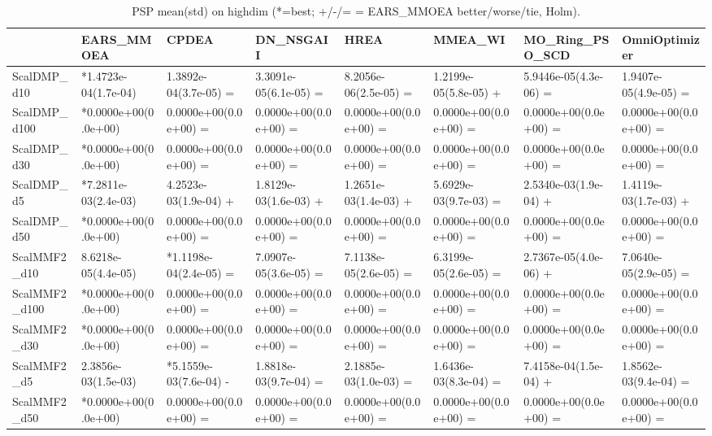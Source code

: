 \begin{table}[t]
\centering
\caption{PSP mean(std) on highdim (*=best; +/-/= = EARS_MMOEA better/worse/tie, Holm).}
\label{tab:highdim_PSP}
\begin{tabular}{llllllll}
\toprule
 & EARS\_MMOEA & CPDEA & DN\_NSGAII & HREA & MMEA\_WI & MO\_Ring\_PSO\_SCD & OmniOptimizer \\
\midrule
ScalDMP\_d10 & *1.4723e-04(1.7e-04) & 1.3892e-04(3.7e-05) = & 3.3091e-05(6.1e-05) = & 8.2056e-06(2.5e-05) = & 1.2199e-05(5.8e-05) + & 5.9446e-05(4.3e-06) = & 1.9407e-05(4.9e-05) = \\
ScalDMP\_d100 & *0.0000e+00(0.0e+00) & 0.0000e+00(0.0e+00) = & 0.0000e+00(0.0e+00) = & 0.0000e+00(0.0e+00) = & 0.0000e+00(0.0e+00) = & 0.0000e+00(0.0e+00) = & 0.0000e+00(0.0e+00) = \\
ScalDMP\_d30 & *0.0000e+00(0.0e+00) & 0.0000e+00(0.0e+00) = & 0.0000e+00(0.0e+00) = & 0.0000e+00(0.0e+00) = & 0.0000e+00(0.0e+00) = & 0.0000e+00(0.0e+00) = & 0.0000e+00(0.0e+00) = \\
ScalDMP\_d5 & *7.2811e-03(2.4e-03) & 4.2523e-03(1.9e-04) + & 1.8129e-03(1.6e-03) + & 1.2651e-03(1.4e-03) + & 5.6929e-03(9.7e-03) = & 2.5340e-03(1.9e-04) + & 1.4119e-03(1.7e-03) + \\
ScalDMP\_d50 & *0.0000e+00(0.0e+00) & 0.0000e+00(0.0e+00) = & 0.0000e+00(0.0e+00) = & 0.0000e+00(0.0e+00) = & 0.0000e+00(0.0e+00) = & 0.0000e+00(0.0e+00) = & 0.0000e+00(0.0e+00) = \\
ScalMMF2\_d10 & 8.6218e-05(4.4e-05) & *1.1198e-04(2.4e-05) = & 7.0907e-05(3.6e-05) = & 7.1138e-05(2.6e-05) = & 6.3199e-05(2.6e-05) = & 2.7367e-05(4.0e-06) + & 7.0640e-05(2.9e-05) = \\
ScalMMF2\_d100 & *0.0000e+00(0.0e+00) & 0.0000e+00(0.0e+00) = & 0.0000e+00(0.0e+00) = & 0.0000e+00(0.0e+00) = & 0.0000e+00(0.0e+00) = & 0.0000e+00(0.0e+00) = & 0.0000e+00(0.0e+00) = \\
ScalMMF2\_d30 & *0.0000e+00(0.0e+00) & 0.0000e+00(0.0e+00) = & 0.0000e+00(0.0e+00) = & 0.0000e+00(0.0e+00) = & 0.0000e+00(0.0e+00) = & 0.0000e+00(0.0e+00) = & 0.0000e+00(0.0e+00) = \\
ScalMMF2\_d5 & 2.3856e-03(1.5e-03) & *5.1559e-03(7.6e-04) - & 1.8818e-03(9.7e-04) = & 2.1885e-03(1.0e-03) = & 1.6436e-03(8.3e-04) = & 7.4158e-04(1.5e-04) + & 1.8562e-03(9.4e-04) = \\
ScalMMF2\_d50 & *0.0000e+00(0.0e+00) & 0.0000e+00(0.0e+00) = & 0.0000e+00(0.0e+00) = & 0.0000e+00(0.0e+00) = & 0.0000e+00(0.0e+00) = & 0.0000e+00(0.0e+00) = & 0.0000e+00(0.0e+00) = \\
\bottomrule
\end{tabular}
\end{table}
